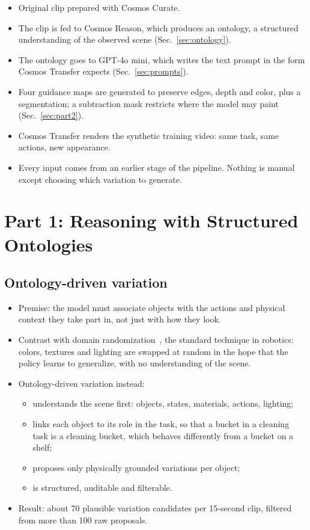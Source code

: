 \begin{itemize}
    \item Original clip prepared with Cosmos Curate.
    \item The clip is fed to Cosmos Reason, which produces an ontology, a structured understanding of the observed scene (Sec.~\ref{sec:ontology}).
    \item The ontology goes to GPT-4o mini, which writes the text prompt in the form Cosmos Transfer expects (Sec.~\ref{sec:prompts}).
    \item Four guidance maps are generated to preserve edges, depth and color, plus a segmentation; a subtraction mask restricts where the model may paint (Sec.~\ref{sec:part2}).
    \item Cosmos Transfer renders the synthetic training video: same task, same actions, new appearance.
    \item Every input comes from an earlier stage of the pipeline. Nothing is manual except choosing which variation to generate.
\end{itemize}

\section{Part 1: Reasoning with Structured Ontologies}
\label{sec:part1}

\subsection{Ontology-driven variation}

\begin{itemize}
    \item Premise: the model must associate objects with the actions and physical context they take part in, not just with how they look.
    \item Contrast with domain randomization~\cite{tobin2017}, the standard technique in robotics: colors, textures and lighting are swapped at random in the hope that the policy learns to generalize, with no understanding of the scene.
    \item Ontology-driven variation instead:
    \begin{itemize}
        \item understands the scene first: objects, states, materials, actions, lighting;
        \item links each object to its role in the task, so that a bucket in a cleaning task is a cleaning bucket, which behaves differently from a bucket on a shelf;
        \item proposes only physically grounded variations per object;
        \item is structured, auditable and filterable.
    \end{itemize}
    \item Result: about 70 plausible variation candidates per 15-second clip, filtered from more than 100 raw proposals.
\end{itemize}

